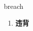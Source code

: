 
\begin{frame}
{\huge breach}
\begin{center}
\begin{enumerate}\Large
  \item \textbf{违背}
\end{enumerate}
\end{center}
\end{frame}
